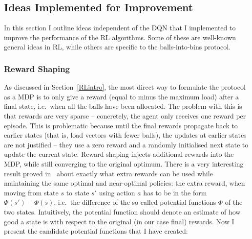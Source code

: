 \subsection{Ideas Implemented for Improvement} \label{improvementideas}


In this section I outline ideas independent of the DQN that I implemented to improve the performance of the RL algorithms. Some of these are well-known general ideas in RL, while others are specific to the \TwoThinning balls-into-bins protocol.


\subsubsection*{Reward Shaping} \label{rewardshaping}

As discussed in Section~\ref{RLintro}, the most direct way to formulate the \TwoThinning protocol as a MDP is to only give a reward (equal to minus the maximum load) after a final state, i.e.\ when all the balls have been allocated. The problem with this is that rewards are very sparse -- concretely, the agent only receives one reward per episode. This is problematic because until the final rewards propagate back to earlier states (that is, load vectors with fewer balls), the updates at earlier states are not justified -- they use a zero reward and a randomly initialised next state to update the current state. Reward shaping injects additional rewards into the MDP, while still converging to the original optimum. There is a very interesting result proved in~\cite{ng1999rewardshaping} about exactly what extra rewards can be used while maintaining the same optimal and near-optimal policies: the extra reward, when moving from state $s$ to state $s'$ using action $a$ has to be in the form $\Phi(s')-\Phi(s)$, i.e.\ the difference of the so-called potential functions $\Phi$ of the two states. Intuitively, the potential function should denote an estimate of how good a state is with respect to the original (in our case final) rewards. Now I present the candidate potential functions that I have created:

